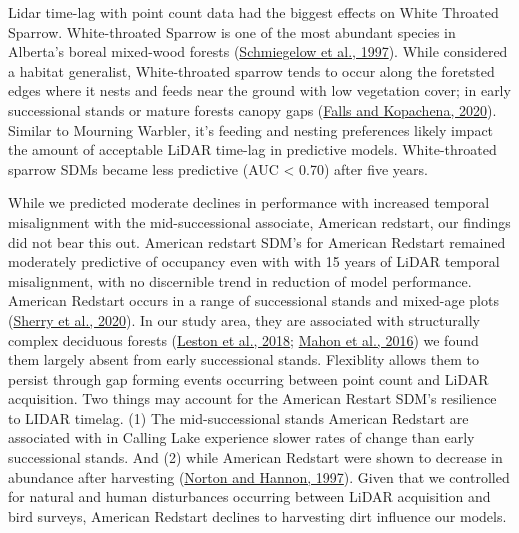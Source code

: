 \documentclass[
]{article}
\begin{document}
Lidar time-lag with point count data had the biggest effects on White Throated Sparrow. White-throated Sparrow is one of the most abundant species in Alberta's boreal mixed-wood forests (\protect\hyperlink{ref-Schmiegelow1997}{Schmiegelow et al., 1997}). While considered a habitat generalist, White-throated sparrow tends to occur along the foretsted edges where it nests and feeds near the ground with low vegetation cover; in early successional stands or mature forests canopy gaps (\protect\hyperlink{ref-fallsWhitethroatedSparrowZonotrichia2020}{Falls and Kopachena, 2020}). Similar to Mourning Warbler, it's feeding and nesting preferences likely impact the amount of acceptable LiDAR time-lag in predictive models. White-throated sparrow SDMs became less predictive (AUC \textless{} 0.70) after five years.

While we predicted moderate declines in performance with increased temporal misalignment with the mid-successional associate, American redstart, our findings did not bear this out. American redstart SDM's for American Redstart remained moderately predictive of occupancy even with with 15 years of LiDAR temporal misalignment, with no discernible trend in reduction of model performance. American Redstart occurs in a range of successional stands and mixed-age plots (\protect\hyperlink{ref-sherryAmericanRedstartSetophaga2020a}{Sherry et al., 2020}).
In our study area, they are associated with structurally complex deciduous forests (\protect\hyperlink{ref-lestonLongtermChangesBoreal2018}{Leston et al., 2018}; \protect\hyperlink{ref-Mahon2016}{Mahon et al., 2016}) we found them largely absent from early successional stands. Flexiblity allows them to persist through gap forming events occurring between point count and LiDAR acquisition. Two things may account for the American Restart SDM's resilience to LIDAR timelag. (1) The mid-successional stands American Redstart are associated with in Calling Lake experience slower rates of change than early successional stands. And (2) while American Redstart were shown to decrease in abundance after harvesting (\protect\hyperlink{ref-nortonSongbirdResponsePartialcut1997}{Norton and Hannon, 1997}). Given that we controlled for natural and human disturbances occurring between LiDAR acquisition and bird surveys, American Redstart declines to harvesting dirt influence our models.
\end{document}
